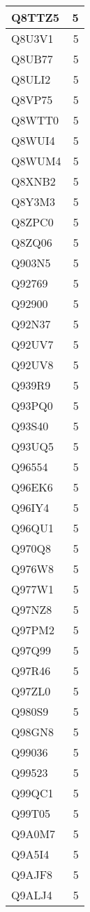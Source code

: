 \documentclass[
]{book}
\theoremstyle{definition}
\theoremstyle{definition}
\theoremstyle{definition}
\theoremstyle{definition}
\theoremstyle{remark}
\begin{document}
\begin{table}
\begin{tabular}{l|r}
\hline
Q8TTZ5 & 5\\
\hline
Q8U3V1 & 5\\
\hline
Q8UB77 & 5\\
\hline
Q8ULI2 & 5\\
\hline
Q8VP75 & 5\\
\hline
Q8WTT0 & 5\\
\hline
Q8WUI4 & 5\\
\hline
Q8WUM4 & 5\\
\hline
Q8XNB2 & 5\\
\hline
Q8Y3M3 & 5\\
\hline
Q8ZPC0 & 5\\
\hline
Q8ZQ06 & 5\\
\hline
Q903N5 & 5\\
\hline
Q92769 & 5\\
\hline
Q92900 & 5\\
\hline
Q92N37 & 5\\
\hline
Q92UV7 & 5\\
\hline
Q92UV8 & 5\\
\hline
Q939R9 & 5\\
\hline
Q93PQ0 & 5\\
\hline
Q93S40 & 5\\
\hline
Q93UQ5 & 5\\
\hline
Q96554 & 5\\
\hline
Q96EK6 & 5\\
\hline
Q96IY4 & 5\\
\hline
Q96QU1 & 5\\
\hline
Q970Q8 & 5\\
\hline
Q976W8 & 5\\
\hline
Q977W1 & 5\\
\hline
Q97NZ8 & 5\\
\hline
Q97PM2 & 5\\
\hline
Q97Q99 & 5\\
\hline
Q97R46 & 5\\
\hline
Q97ZL0 & 5\\
\hline
Q980S9 & 5\\
\hline
Q98GN8 & 5\\
\hline
Q99036 & 5\\
\hline
Q99523 & 5\\
\hline
Q99QC1 & 5\\
\hline
Q99T05 & 5\\
\hline
Q9A0M7 & 5\\
\hline
Q9A5I4 & 5\\
\hline
Q9AJF8 & 5\\
\hline
Q9ALJ4 & 5\\

\end{tabular}
\end{table}
\end{document}
